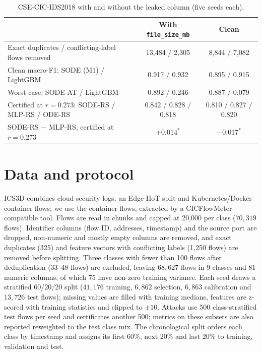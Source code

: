 \documentclass{article}
\theoremstyle{definition}
\begin{document}
\begin{table}[h]
\caption{CSE-CIC-IDS2018 with and without the leaked column (five seeds each).}
\label{tab:leak}
\centering\small
\begin{tabular}{lcc}
\toprule
& With \texttt{file\_size\_mb} & Clean\\
\midrule
Exact duplicates / conflicting-label flows removed & 13{,}484 / 2{,}305 & 8{,}844 / 7{,}082\\
Clean macro-F1: SODE (M1) / LightGBM & 0.917 / 0.932 & 0.895 / 0.915\\
Worst case: SODE-AT / LightGBM & 0.892 / 0.246 & 0.887 / 0.079\\
Certified at $r=0.273$: SODE-RS / MLP-RS / ODE-RS & 0.842 / 0.828 / 0.818 & 0.810 / 0.827 / 0.820\\
SODE-RS $-$ MLP-RS, certified at $r=0.273$ & $+0.014^{*}$ & $-0.017^{*}$\\
\bottomrule
\end{tabular}
\end{table}

\section{Data and protocol}\label{app:data}
ICS3D \citep{anon_ics3d} combines cloud-security logs, an Edge-IIoT split and
Kubernetes/Docker container flows; we use the container flows, extracted by a
CICFlowMeter-compatible tool. Flows are read in chunks and capped at 20{,}000 per
class ($70{,}319$ flows). Identifier columns (flow ID, addresses, timestamp) and the
source port are dropped, non-numeric and mostly empty columns are removed, and
exact duplicates (325) and feature vectors with conflicting labels (1{,}250
flows) are removed before splitting. Three classes with fewer than 100 flows
after deduplication (33--48 flows) are excluded, leaving $68{,}627$ flows in 9
classes and 81 numeric columns, of which 75 have non-zero training variance.
Each seed draws a stratified 60/20/20 split ($41{,}176$ training,
$6{,}862$ selection, $6{,}863$ calibration and $13{,}726$ test flows); missing
values are filled with training medians, features are z-scored with training
statistics and clipped to $\pm10$. Attacks use 500 class-stratified test flows per
seed and certificates another 500; metrics on these subsets are also reported
reweighted to the test class mix. The chronological split orders each class by
timestamp and assigns its first 60\%, next 20\% and last 20\% to training,
validation and test.
\end{document}
